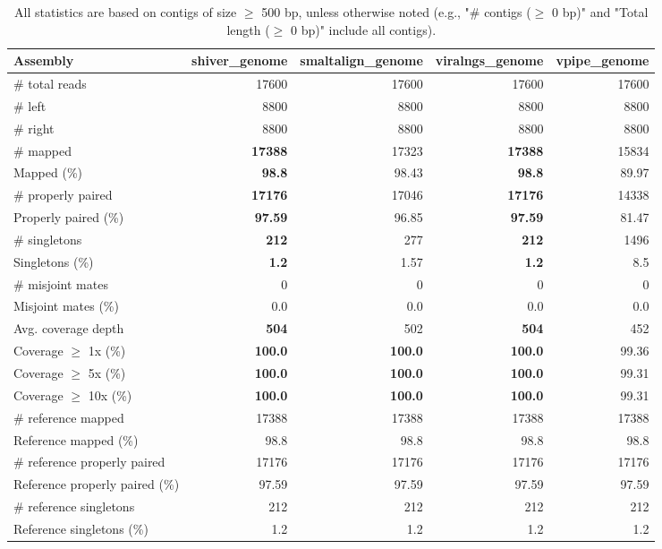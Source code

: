 \documentclass[12pt,a4paper]{article}
\begin{document}
\begin{table}[ht]
\begin{center}
\caption{All statistics are based on contigs of size $\geq$ 500 bp, unless otherwise noted (e.g., "\# contigs ($\geq$ 0 bp)" and "Total length ($\geq$ 0 bp)" include all contigs).}
\begin{tabular}{|l*{4}{|r}|}
\hline
Assembly & shiver\_genome & smaltalign\_genome & viralngs\_genome & vpipe\_genome \\ \hline
\# total reads & 17600 & 17600 & 17600 & 17600 \\ \hline
\# left & 8800 & 8800 & 8800 & 8800 \\ \hline
\# right & 8800 & 8800 & 8800 & 8800 \\ \hline
\# mapped & {\bf 17388} & 17323 & {\bf 17388} & 15834 \\ \hline
Mapped (\%) & {\bf 98.8} & 98.43 & {\bf 98.8} & 89.97 \\ \hline
\# properly paired & {\bf 17176} & 17046 & {\bf 17176} & 14338 \\ \hline
Properly paired (\%) & {\bf 97.59} & 96.85 & {\bf 97.59} & 81.47 \\ \hline
\# singletons & {\bf 212} & 277 & {\bf 212} & 1496 \\ \hline
Singletons (\%) & {\bf 1.2} & 1.57 & {\bf 1.2} & 8.5 \\ \hline
\# misjoint mates & 0 & 0 & 0 & 0 \\ \hline
Misjoint mates (\%) & 0.0 & 0.0 & 0.0 & 0.0 \\ \hline
Avg. coverage depth & {\bf 504} & 502 & {\bf 504} & 452 \\ \hline
Coverage $\geq$ 1x (\%) & {\bf 100.0} & {\bf 100.0} & {\bf 100.0} & 99.36 \\ \hline
Coverage $\geq$ 5x (\%) & {\bf 100.0} & {\bf 100.0} & {\bf 100.0} & 99.31 \\ \hline
Coverage $\geq$ 10x (\%) & {\bf 100.0} & {\bf 100.0} & {\bf 100.0} & 99.31 \\ \hline
\# reference mapped & 17388 & 17388 & 17388 & 17388 \\ \hline
Reference mapped (\%) & 98.8 & 98.8 & 98.8 & 98.8 \\ \hline
\# reference properly paired & 17176 & 17176 & 17176 & 17176 \\ \hline
Reference properly paired (\%) & 97.59 & 97.59 & 97.59 & 97.59 \\ \hline
\# reference singletons & 212 & 212 & 212 & 212 \\ \hline
Reference singletons (\%) & 1.2 & 1.2 & 1.2 & 1.2 \\ \hline

\end{tabular}
\end{center}
\end{table}
\end{document}
